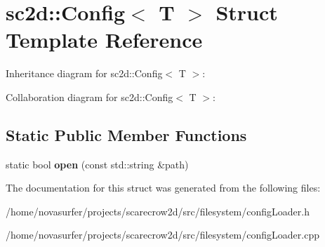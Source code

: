 \hypertarget{structsc2d_1_1Config}{}\section{sc2d\+:\+:Config$<$ T $>$ Struct Template Reference}
\label{structsc2d_1_1Config}


Inheritance diagram for sc2d\+:\+:Config$<$ T $>$\+:


Collaboration diagram for sc2d\+:\+:Config$<$ T $>$\+:
\subsection*{Static Public Member Functions}
\begin{DoxyCompactItemize}
\item 
\mbox{\label{structsc2d_1_1Config_a9df99fe248ed7dbdbe8adf571d6d7f2c}} 
static bool {\bfseries open} (const std\+::string \&path)
\end{DoxyCompactItemize}


The documentation for this struct was generated from the following files\+:\begin{DoxyCompactItemize}
\item 
/home/novasurfer/projects/scarecrow2d/src/filesystem/config\+Loader.\+h\item 
/home/novasurfer/projects/scarecrow2d/src/filesystem/config\+Loader.\+cpp\end{DoxyCompactItemize}
